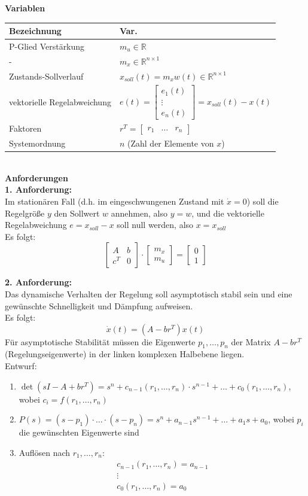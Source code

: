 \documentclass[10pt,a4paper]{article}
\newcommand{\tab}[1][1]{\hspace*{#1cm}}
\newcommand{\vect}[1]{\ensuremath{\begin{bmatrix}#1\end{bmatrix}}}
\begin{document}
\textbf{Variablen} ~\\
\begin{tabularx}{\columnwidth}{ll}
	Bezeichnung & Var. \\
	\hline
	P-Glied Verstärkung & $m_u \in \mathbb{R}$ \\
	\tab - & $m_x \in \mathbb{R}^{n \times 1}$  \\
	Zustands-Sollverlauf & $x_{soll}(t) = m_xw(t) \in \mathbb{R}^{n \times 1}$  \\
	vektorielle Regelabweichung & $e(t) = \vect{e_1(t) \\ \vdots \\ e_n(t)} = x_{soll}(t) - x(t)$  \\
	Faktoren & $r^T = \vect{r_1 & \dots & r_n}$ \\
	Systemordnung & $n$ (Zahl der Elemente von $x$)
\end{tabularx} ~\\

\textbf{Anforderungen} ~\\
\textbf{1. Anforderung:} ~\\
Im stationären Fall (d.h. im eingeschwungenen Zustand mit $\dot x = 0$) soll die Regelgröße $y$ den Sollwert $w$ annehmen, also $y = w$, und die vektorielle Regelabweichung $e = x_{soll} − x$ soll null werden, also $x = x_{soll}$ \\
Es folgt:
$$
	\vect{A & b \\ c^T & 0} ⋅ \vect{m_x \\ m_u} = \vect{0 \\ 1}
$$

\textbf{2. Anforderung:} ~\\
Das dynamische Verhalten der Regelung soll asymptotisch stabil sein und eine gewünschte Schnelligkeit und Dämpfung aufweisen. \\
Es folgt:
$$
	\dot x(t) = (A - br^T)x(t)
$$
Für asymptotische Stabilität müssen die Eigenwerte $p_1, \dots, p_n$ der Matrix $A - br^T$ (Regelungseigenwerte) in der linken komplexen Halbebene liegen. \\

Entwurf:
\begin{enumerate}
	\item $\det(sI - A + br^T) = s^n + c_{n-1}(r_1, \dots, r_n) ⋅ s^{n-1} + \dots + c_0(r_1, \dots, r_n)$, \tab wobei $c_i = f(r_1, \dots, r_n)$
	\item $P(s) = (s - p_1) ⋅ \dots ⋅ (s - p_n) = s^n + a_{n-1}s^{n - 1} + \dots + a_1s + a_0$, \tab wobei $p_i$ die gewünschten Eigenwerte sind
	\item Auflösen nach $r_1, \dots, r_n$: \\
	$$\begin{array}{c}
		c_{n-1}(r_1, \dots, r_n) = a_{n-1} \\
		\vdots \\
		c_0(r_1, \dots, r_n) = a_0
	\end{array}$$
\end{enumerate}
\end{document}
